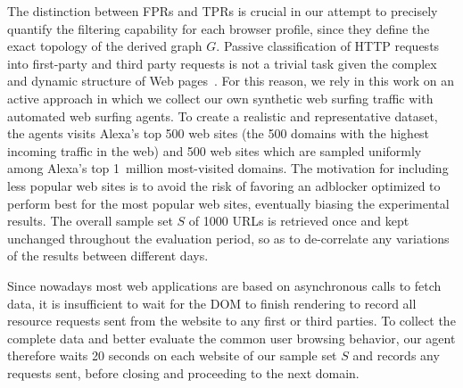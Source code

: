 \documentclass[compsoc, conference, letterpaper, 10pt, times]{IEEEtran}
\begin{document}
The distinction between FPRs and TPRs is crucial in our attempt to precisely quantify the filtering capability for each browser profile, since they define the exact topology of the derived graph $G$.
Passive classification of HTTP requests into first-party and third party requests is not a trivial task given the complex and dynamic structure of Web pages~\cite{pujol}. For this reason, we rely in this work on an active approach in which we collect our own synthetic web surfing traffic with  automated web surfing agents. To create a realistic and representative dataset, the agents visits Alexa's top 500 web sites (the 500 domains with the highest incoming traffic in the web) and 500 web sites which are sampled uniformly among Alexa's top 1~million most-visited domains. The motivation for including less popular web sites is to avoid the risk of favoring an adblocker optimized to perform best for the most popular web sites, eventually biasing the experimental results. The overall sample set $S$ of 1000 URLs is retrieved once and kept unchanged throughout the evaluation period, so as to de-correlate any variations of the results between different days.


Since nowadays most web applications are based on asynchronous calls to fetch data, it is insufficient to wait for the DOM to finish rendering to record all resource requests sent from the website to any first or third parties. To collect the complete data and better evaluate the common user browsing behavior, our agent therefore waits 20 seconds on each website of our sample set $S$ and records any requests sent, before closing and proceeding to the next domain. 
\end{document}
